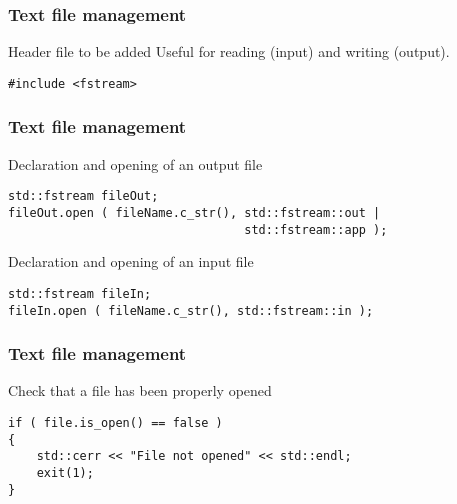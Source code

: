 \documentclass{beamer}
\author{Antonio Cervone}
\date{October 12 2012}
\institute{Politecnico di Milano}
\begin{document}

\begin{frame}[fragile]

    \frametitle{Text file management}

    \begin{block}{Header file to be added}
        Useful for reading (input) and writing (output).
        \begin{verbatim}
#include <fstream>
        \end{verbatim}
    \end{block}

\end{frame}


\begin{frame}[fragile]

    \frametitle{Text file management}

    \begin{block}{Declaration and opening of an output file}
        \begin{verbatim}
std::fstream fileOut;
fileOut.open ( fileName.c_str(), std::fstream::out |
                                 std::fstream::app );
        \end{verbatim}
    \end{block}

    \begin{block}{Declaration and opening of an input file}
        \begin{verbatim}
std::fstream fileIn;
fileIn.open ( fileName.c_str(), std::fstream::in );
        \end{verbatim}
    \end{block}

\end{frame}


\begin{frame}[fragile]

    \frametitle{Text file management}

    \begin{block}{Check that a file has been properly opened}
        \begin{verbatim}
if ( file.is_open() == false )
{
    std::cerr << "File not opened" << std::endl;
    exit(1);
}
        \end{verbatim}
    \end{block}

\end{frame}
\end{document}

